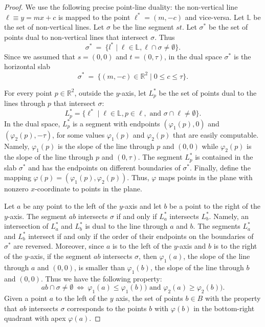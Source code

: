 \documentclass[a4paper,11pt]{article}
\newcommand{\RR}{\ensuremath{\mathbb R}}  %
\newcommand{\LL}{\ensuremath{\mathbb L}}  %
\let\le\leqslant
\let\ge\geqslant
\begin{document}
\begin{proof}
	We use the following precise point-line duality: 
	the non-vertical line $\ell \equiv y=mx+c$ 
	is mapped to the point $\ell^*=(m,-c)$ and
	vice-versa. 
	Let $\LL$ be the set of non-vertical lines.
	Let $\sigma$ be the line segment $st$.
	Let $\sigma^*$ be the set of points dual to non-vertical lines that intersect $\sigma$.
	Thus
	\[
		\sigma^* ~=~ \{ l^* \mid \ell\in \LL, \ell\cap \sigma\neq \emptyset\}.
	\]
	Since we assumed that $s=(0,0)$ and $t=(0,\tau)$, 
	in the dual space $\sigma^*$ is the horizontal slab 
	\[
		\sigma^* ~=~ \{ (m,-c)\in \RR^2\mid 0\le c\le \tau\}.
	\]
	
	For every point $p\in \RR^2$, outside the $y$-axis, 
	let $L^* _p$ be the set of points dual
	to the lines through $p$ that intersect $\sigma$:
	\[
		L^*_p=\{ \ell^* \mid \ell\in \LL, p \in \ell, \text{ and } \sigma\cap \ell\not= \emptyset\}.
	\]
	In the dual space, $L^*_p$ is a segment with endpoints 
	$(\varphi_1(p),0)$ and $(\varphi_2(p),-\tau)$, 
	for some values $\varphi_1(p)$ and $\varphi_2(p)$
	that are easily computable.
	Namely, $\varphi_1(p)$ is the slope of the line through $p$
	and $(0,0)$ while $\varphi_2(p)$ is the slope of the line through $p$ and $(0,\tau)$.
	The segment $L^*_p$ is contained in the slab $\sigma^*$ and has the endpoints on
	different boundaries of $\sigma^*$.
	Finally, define the mapping $\varphi(p)=(\varphi_1(p),\varphi_2(p))$.
	Thus, $\varphi$ maps points in the plane with nonzero $x$-coordinate
	to points in the plane. 

	Let $a$ be any point to the left of the $y$-axis and 
	let $b$ be a point to the right of the $y$-axis.
	The segment $ab$ intersects $\sigma$ if and only if $L^*_a$ intersects $L^*_b$.
	Namely, an intersection of $L^*_a$ and $L^*_b$ is dual to the line
	through $a$ and $b$. The segments $L^*_a$ and $L^*_b$ intersect if
	and only if the order of their endpoints on the boundaries of $\sigma^*$ are reversed.
	Moreover, since $a$ is to the left of the $y$-axis and $b$ is to the right
	of the $y$-axis, if the segment $ab$ intersects $\sigma$,
    then $\varphi_1(a)$, the slope of the line through $a$ and $(0,0)$,
    is smaller than $\varphi_1(b)$, the slope of the line through $b$ and $(0,0)$.
	Thus we have the following property:
	\[
		ab \cap \sigma \neq \emptyset ~\Longleftrightarrow ~ 
		\varphi_1(a)\le \varphi_1(b)) \text{ and } \varphi_2(a)\ge \varphi_2(b)).
	\]			
	Given a point $a$ to the left of the $y$ axis, 
	the set of points $b\in B$ with the property
	that $ab$ intersects $\sigma$ corresponds to the points $b$ with $\varphi(b)$
	in the bottom-right quadrant with apex $\varphi(a)$. 	


\end{proof}
\end{document}
